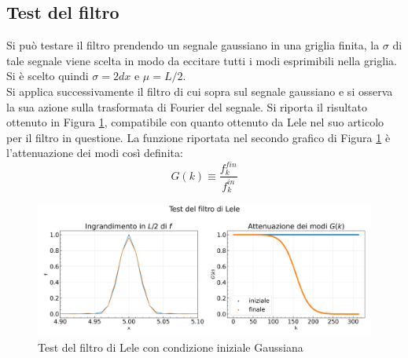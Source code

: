 \subsection{Test del filtro}
Si può testare il filtro prendendo un segnale gaussiano in una griglia finita, la $\sigma$ di tale segnale viene scelta in modo da eccitare tutti i modi esprimibili nella griglia. Si è scelto quindi $\sigma = 2 dx$ e $\mu = L/2$.\\
Si applica successivamente il filtro di cui sopra sul segnale gaussiano e si osserva la sua azione sulla trasformata di Fourier del segnale. 
Si riporta il risultato ottenuto in Figura \ref{fig:lele}, compatibile con quanto ottenuto da Lele nel suo articolo per il filtro in questione.
La funzione riportata nel secondo grafico di Figura \ref{fig:lele} è l'attenuazione dei modi così definita:
\[
    G(k) \equiv \frac{f_k^{fin}}{f_k^{in}}
\]
\begin{figure}[H]
    \centering
    \includegraphics[width=\textwidth]{../../figure/test_lelefilter.png}
    \caption{\scriptsize Test del filtro di Lele con condizione iniziale Gaussiana}
    \label{fig:lele}
\end{figure}

